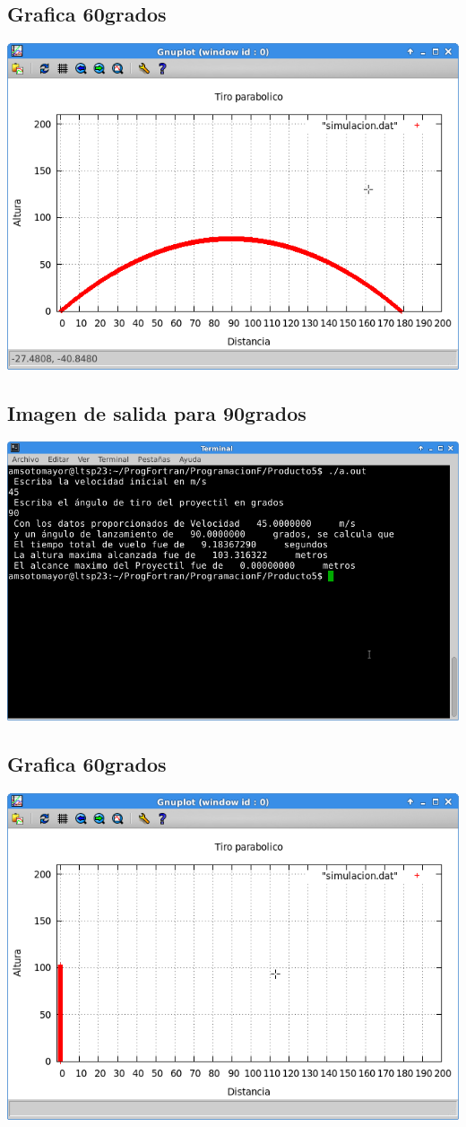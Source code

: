 \documentclass[letterpaper,10pt,twoside,onecolumn]{article}
\begin{document}
\subsection{Grafica 60grados}

\includegraphics[scale=.50]{grafica60g.png}

\subsection{Imagen de salida para 90grados}

\includegraphics[scale=.40]{Salida90g.png}

\subsection{Grafica 60grados}

\includegraphics[scale=.50]{grafica90g.png}
\end{document}
